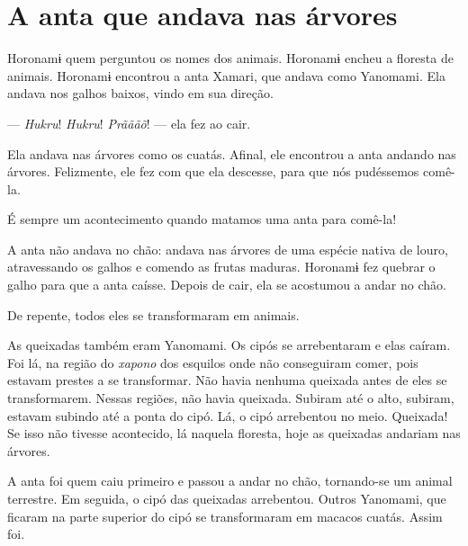  \chapter{A anta que andava nas árvores}
 
 Horonamɨ quem perguntou os nomes dos animais. Horonamɨ encheu a
floresta de animais. 
Horonamɨ encontrou a anta Xamari, que andava como Yanomami. Ela andava
nos galhos baixos, vindo em sua direção. 

--- \textit{Hukru}! \textit{Hukru}! \textit{Prãããõ}! --- ela fez ao cair. 

Ela andava nas árvores como os cuatás. Afinal, ele encontrou a anta
andando nas árvores. Felizmente, ele fez com que ela descesse, para que
nós pudéssemos comê-la. 

É sempre um acontecimento quando matamos uma anta para comê-la! 

A anta não andava no chão: andava nas árvores de uma espécie nativa de
louro, atravessando os galhos e comendo as frutas maduras. Horonamɨ fez
quebrar o galho para que a anta caísse. Depois de cair, ela se acostumou
a andar no chão. 



De repente, todos eles se transformaram em animais. 

As queixadas também eram Yanomami. Os cipós se
arrebentaram e elas caíram. Foi lá, na região do \textit{xapono} dos esquilos
onde não conseguiram comer, pois estavam prestes a se transformar. Não
havia nenhuma queixada antes de eles se transformarem. Nessas regiões,
não havia queixada. Subiram até o alto, subiram, estavam subindo até a
ponta do cipó. Lá, o cipó arrebentou no meio. Queixada! Se isso não
tivesse acontecido, lá naquela floresta, hoje as queixadas andariam nas
árvores. 

A anta foi quem caiu primeiro e passou a andar no chão, tornando-se um
animal terrestre. Em seguida, o cipó das queixadas arrebentou. Outros
Yanomami, que ficaram na parte superior do cipó se transformaram em
macacos cuatás. Assim foi. 

